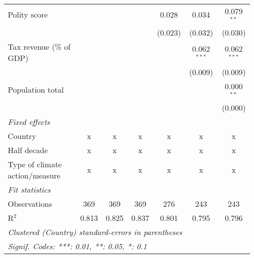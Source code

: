 \begin{tabular}{lcccccc}
   Polity score                                                  &         &                &                & 0.028          & 0.034          & 0.079$^{**}$\\   
                                                                 &         &                &                & (0.023)        & (0.032)        & (0.030)\\   
   Tax revenue (\% of GDP)                                       &         &                &                &                & 0.062$^{***}$  & 0.062$^{***}$\\   
                                                                 &         &                &                &                & (0.009)        & (0.009)\\   
   Population total                                              &         &                &                &                &                & 0.000$^{**}$\\   
                                                                 &         &                &                &                &                & (0.000)\\   
   \emph{Fixed effects}\\
   Country                                                       & x       & x              & x              & x              & x              & x\\  
   Half decade                                                   & x       & x              & x              & x              & x              & x\\  
   Type of climate action/measure                                & x       & x              & x              & x              & x              & x\\  
   \midrule \emph{Fit statistics}\\
   Observations                                                  & 369     & 369            & 369            & 276            & 243            & 243\\  
   R$^2$                                                         & 0.813   & 0.825          & 0.837          & 0.801          & 0.795          & 0.796\\  
   \midrule
   \multicolumn{7}{l}{\emph{Clustered (Country) standard-errors in parentheses}}\\
   \multicolumn{7}{l}{\emph{Signif. Codes: ***: 0.01, **: 0.05, *: 0.1}}\\
\end{tabular}
\par\endgroup


